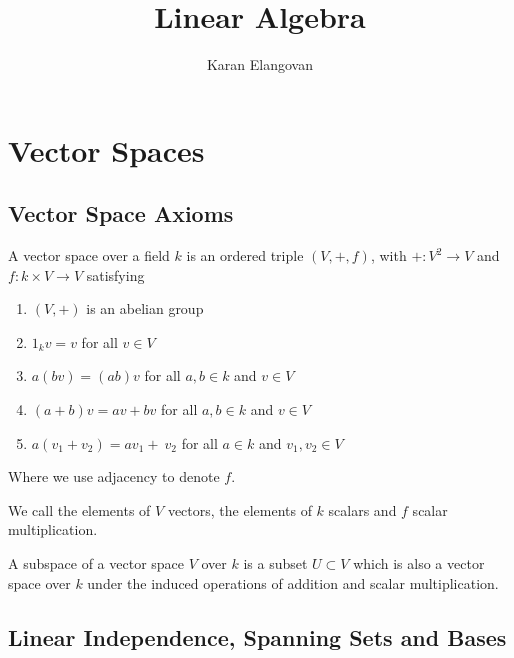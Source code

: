 \documentclass[]{article}
\title{Linear Algebra}
\author{Karan Elangovan}
\begin{document}
\maketitle

\doublespacing
\tableofcontents

\section{Vector Spaces}

\subsection{Vector Space Axioms}

\begin{defi} 
		A vector space over a field $k$ is an ordered triple $(V, +, f)$, with $+: V^2 \to V$ and $f: k \times V \to V$ satisfying 
		\begin{enumerate}
				\item $(V, +)$ is an abelian group
				\item $1_kv = v$ for all $v \in V$
				\item  $a (b v) = (a b) v$ for all $a, b \in k$ and $v \in V$
				\item  $(a + b)v = a v + b v$ for all $a, b \in k$ and $v \in V$
				\item $ a(v_1 + v_2) = a v_1 + \ v_2$ for all $a \in k$ and $v_1, v_2 \in V$
		\end{enumerate}
		Where we use adjacency to denote $f$.

		We call the elements of $V$ vectors, the elements of $k$ scalars and $f$ scalar multiplication.
\end{defi}

\begin{defi} [Subspace]
		A subspace of a vector space $V$ over $k$ is a subset $U \subset V$ which is also a vector space over $k$ under the induced operations of addition and scalar multiplication.
\end{defi}

\subsection{Linear Independence, Spanning Sets and Bases}
\end{document}
